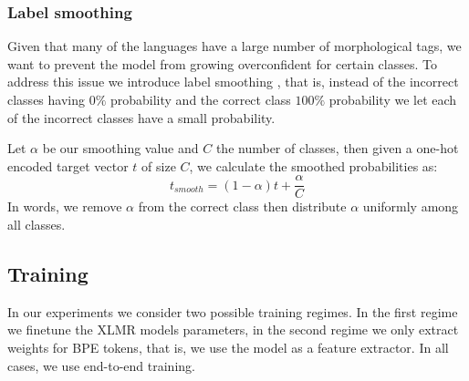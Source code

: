 \documentclass[11pt]{article}
\newcommand\jp[1]{(\textbf{JP:} #1)}
\begin{document}
	\subsubsection{Label smoothing}
    	Given that many of the languages have a large number of
     morphological tags, we want to prevent the model from growing
     overconfident for certain classes. To address this issue we
     introduce label smoothing \cite{szegedy2016rethinking}, that is,
     instead of the incorrect classes having $0\%$ probability and the
     correct class $100\%$ probability we let each of the incorrect
     classes have a small probability.


     Let $\alpha$ be our smoothing value and $C$ the number of
     classes, then given a one-hot encoded target vector $t$ of size
     $C$, we calculate the smoothed probabilities as:
    \begin{equation}
        t_{smooth} = (1-\alpha)t + \frac{\alpha}{C}
    \end{equation}
    In words, we remove $\alpha$ from the correct class then
    distribute $\alpha$ uniformly among all classes.

     \subsection{Training}

	
     In our experiments we consider two possible training regimes. In
     the first regime we finetune the XLMR models parameters, in the
     second regime we only extract weights for BPE tokens, that is, we
     use the model as a feature extractor. In all cases, we use
     end-to-end training.
\end{document}
